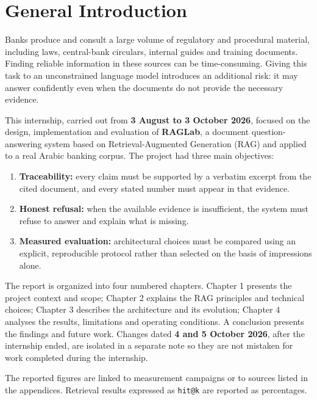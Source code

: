 \documentclass[a4paper,12pt,openany]{report}
\begin{document}
\chapter*{General Introduction}

Banks produce and consult a large volume of regulatory and procedural material, including laws,
central-bank circulars, internal guides and training documents. Finding reliable information in
these sources can be time-consuming. Giving this task to an unconstrained language model introduces
an additional risk: it may answer confidently even when the documents do not provide the necessary
evidence.

This internship, carried out from \textbf{3 August to 3 October 2026}, focused on the design,
implementation and evaluation of \textbf{RAGLab}, a document question-answering system based on
Retrieval-Augmented Generation (RAG) and applied to a real Arabic banking corpus. The project had
three main objectives:

\begin{enumerate}
  \item \textbf{Traceability:} every claim must be supported by a verbatim excerpt from the cited
document, and every stated number must appear in that evidence.
  \item \textbf{Honest refusal:} when the available evidence is insufficient, the system must refuse
to answer and explain what is missing.
  \item \textbf{Measured evaluation:} architectural choices must be compared using an explicit,
reproducible protocol rather than selected on the basis of impressions alone.
\end{enumerate}

The report is organized into four numbered chapters. Chapter 1 presents the project context and
scope; Chapter 2 explains the RAG principles and technical choices; Chapter 3 describes the
architecture and its evolution; Chapter 4 analyses the results, limitations and operating
conditions. A conclusion presents the findings and future work. Changes dated \textbf{4 and
5 October 2026}, after the internship ended, are isolated in a separate note so they are not
mistaken for work completed during the internship.

The reported figures are linked to measurement campaigns or to sources listed in the appendices.
Retrieval results expressed as \texttt{hit@k} are reported as percentages.
\end{document}
